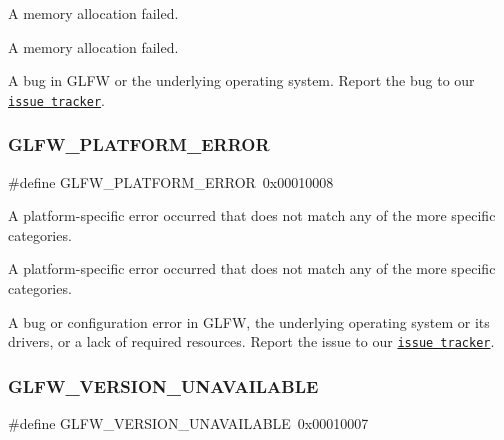 A memory allocation failed. 

A memory allocation failed.

A bug in G\+L\+FW or the underlying operating system. Report the bug to our \href{https://github.com/glfw/glfw/issues}{\tt issue tracker}. \mbox{\label{group__errors_gad44162d78100ea5e87cdd38426b8c7a1}} 
\subsubsection{\texorpdfstring{G\+L\+F\+W\+\_\+\+P\+L\+A\+T\+F\+O\+R\+M\+\_\+\+E\+R\+R\+OR}{GLFW\_PLATFORM\_ERROR}}
{\footnotesize\ttfamily \#define G\+L\+F\+W\+\_\+\+P\+L\+A\+T\+F\+O\+R\+M\+\_\+\+E\+R\+R\+OR~0x00010008}



A platform-\/specific error occurred that does not match any of the more specific categories. 

A platform-\/specific error occurred that does not match any of the more specific categories.

A bug or configuration error in G\+L\+FW, the underlying operating system or its drivers, or a lack of required resources. Report the issue to our \href{https://github.com/glfw/glfw/issues}{\tt issue tracker}. \mbox{\label{group__errors_gad16c5565b4a69f9c2a9ac2c0dbc89462}} 
\subsubsection{\texorpdfstring{G\+L\+F\+W\+\_\+\+V\+E\+R\+S\+I\+O\+N\+\_\+\+U\+N\+A\+V\+A\+I\+L\+A\+B\+LE}{GLFW\_VERSION\_UNAVAILABLE}}
{\footnotesize\ttfamily \#define G\+L\+F\+W\+\_\+\+V\+E\+R\+S\+I\+O\+N\+\_\+\+U\+N\+A\+V\+A\+I\+L\+A\+B\+LE~0x00010007}



